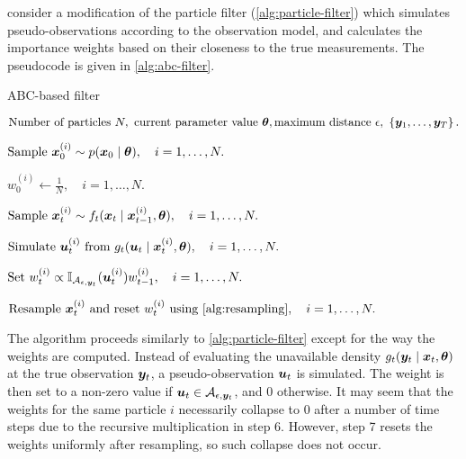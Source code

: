 \cite{jasra-filtering} consider a modification of the particle filter (\autoref{alg:particle-filter}) which simulates pseudo-observations according to the observation model, and calculates the importance weights based on their closeness to the true measurements. The pseudocode is given in \autoref{alg:abc-filter}.

\begin{algorithm}[ht]
    \caption{ABC-based filter}
    \label{alg:abc-filter}
    \begin{algorithmic}[1]
        \Input $\text{Number of particles } N,\ \text{current parameter value } \btheta, \text{maximum distance } \epsilon,\ \left\{\by_1, \ldots, \by_T\right\}.$
        
        \State $\text{Sample } \bm{x}_0^{(i)} \sim p(\bm{x}_0 \mid \bm{\theta}), \quad i = 1, \ldots, N.$ 
        
        \State $w_0^{(i)} \gets \frac{1}{N}, \quad i = 1, \ldots, N.$ 
        
        \State $\text{Sample } \bm{x}_t^{(i)} \sim f_t(\bm{x}_t \mid \bm{x}_{t-1}^{(i)}, \bm{\theta}), \quad i = 1, \ldots, N.$ 
        
        \State $\text{Simulate } \bm{u}_t^{(i)} \text{ from } g_t(\bm{u}_t \mid \bm{x}_t^{(i)}, \bm{\theta}), \quad i = 1, \ldots, N.$ 
        
        \State $\text{Set } w_t^{(i)} \propto \mathbb{I}_{\mathcal{A}_{\epsilon, \bm{y}_t}}(\bm{u}_t^{(i)}) w_{t-1}^{(i)}, \quad i = 1, \ldots, N.$
        
        \State $\text{Resample } \bx_t^{(i)} \text{ and reset } w_t^{(i)} \text{ using \autoref{alg:resampling}}, \quad i = 1, \ldots, N.$
        \EndFor
    \end{algorithmic}
\end{algorithm}

The algorithm proceeds similarly to \autoref{alg:particle-filter} except for the way the weights are computed. Instead of evaluating the unavailable density $g_t(\bm{y}_t \mid \bm{x}_t, \bm{\theta})$ at the true observation $\bm{y}_t$, a pseudo-observation $\bm{u}_t$ is simulated. The weight is then set to a non-zero value if ${\bm{u}_t \in \mathcal{A}_{\epsilon, \bm{y}_t}}$, and 0 otherwise. It may seem that the weights for the same particle $i$ necessarily collapse to 0 after a number of time steps due to the recursive multiplication in step 6. However, step 7 resets the weights uniformly after resampling, so such collapse does not occur.

